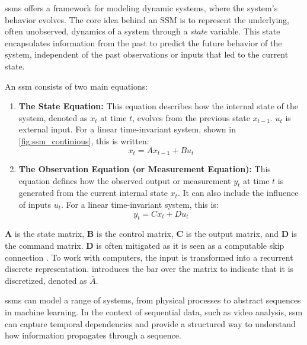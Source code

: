 \acrfull{ssm}s offers a framework for modeling dynamic systems, where the system's behavior evolves. The core idea behind an SSM is to represent the underlying, often unobserved, dynamics of a system through a \textit{state} variable. This state encapsulates information from the past to predict the future behavior of the system, independent of the past observations or inputs that led to the current state.

An \acrshort{ssm} consists of two main equations:

\begin{enumerate}
    \item \textbf{The State Equation:} This equation describes how the internal state of the system, denoted as \(x_t\) at time \(t\), evolves from the previous state \(x_{t-1}\). \(u_t\) is external input. For a linear time-invariant system, shown in \cref{fig:ssm_continious}, this is written:
    \begin{equation}
        x_t = A x_{t-1} + B u_t
        \label{eq:state_equation}
    \end{equation}

    \item \textbf{The Observation Equation (or Measurement Equation):} This equation defines how the observed output or measurement \(y_t\) at time \(t\) is generated from the current internal state \(x_t\). It can also include the influence of inputs \(u_t\). For a linear time-invariant system, this is:
    \begin{equation}
        y_t = C x_t + D u_t
        \label{eq:observation_equation}
    \end{equation}
\end{enumerate}

\textbf{A} is the state matrix, \textbf{B} is the control matrix, \textbf{C} is the output matrix, and \textbf{D} is the command matrix. \textbf{D} is often mitigated as it is seen as a computable skip connection \cite{gu_mamba_2024}. To work with computers, the input is transformed into a recurrent discrete representation. \textcite{gu_mamba_2024} introduces the bar over the matrix to indicate that it is discretized, denoted as $ \bar{A} $.

\acrshort{ssm}s can model a range of systems, from physical processes to abstract sequences in machine learning. In the context of sequential data, such as video analysis, \acrshort{ssm} can capture temporal dependencies and provide a structured way to understand how information propagates through a sequence.

